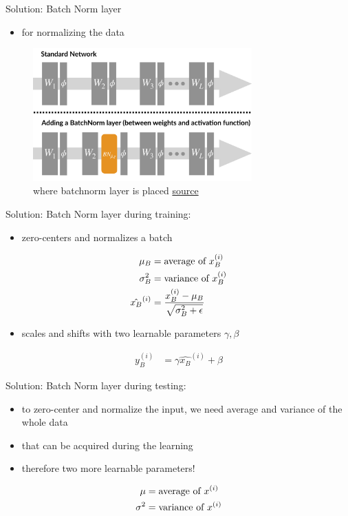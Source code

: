 \begin{frame}{Solution: Batch Norm layer}
	\begin{itemize}
		\item for normalizing the data
	\end{itemize}
	\begin{figure}[H]
		\centering
		\includegraphics[width=0.75\textwidth]{Figs/section_4/batchnorm_2.jpg}
		\caption{where batchnorm layer is placed \href{https://gradientscience.org/batchnorm/}{source}}
	\end{figure}
\end{frame}
\begin{frame}{Solution: Batch Norm layer}
    during training:
    \begin{itemize}
    	\item zero-centers and normalizes a batch
    \end{itemize}
	\begin{align*}
		\mu_B &= \textup{average of $x_B^{(i)}$}\\
		\sigma_B^2 &= \textup{variance of $x_B^{(i)}$}\\
		\hat{x_B}^{(i)} &= \frac{x_B^{(i)} - \mu_B}{\sqrt{\sigma^2_B + \epsilon}}
	\end{align*}
	\begin{itemize}
		\item scales and shifts with two learnable parameters $\gamma, \beta$
	\end{itemize}
	\begin{align*}
		y_B^{(i)} &= \gamma \hat{x_B}^{(i)} + \beta
	\end{align*}
\end{frame}
\begin{frame}{Solution: Batch Norm layer}
	during testing:
	\begin{itemize}
		\item to zero-center and normalize the input, we need average and variance of the whole data
		\item that can be acquired during the learning
		\item therefore two more learnable parameters!
	\end{itemize}
	\begin{align*}
		\mu &= \textup{average of $x^{(i)}$}\\
		\sigma^2 &= \textup{variance of $x^{(i)}$}\\
	\end{align*}
\end{frame}
